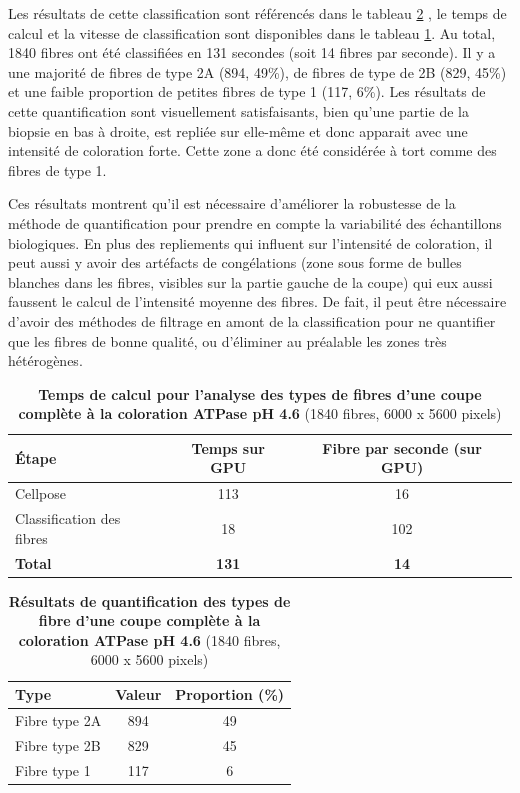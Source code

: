 Les résultats de cette classification sont référencés dans le tableau \ref{tab:atp_wsi_resultstable} , le temps de calcul et la vitesse de classification sont disponibles dans le tableau \ref{tab:atp_wsi_timetable}. Au total, 1840 fibres ont été classifiées en 131 secondes (soit 14 fibres par seconde). Il y a une majorité de fibres de type 2A (894, 49\%), de fibres de type de 2B (829, 45\%) et une faible proportion de petites fibres de type 1 (117, 6\%). Les résultats de cette quantification sont visuellement satisfaisants, bien qu'une partie de la biopsie en bas à droite, est repliée sur elle-même et donc apparait avec une intensité de coloration forte. Cette zone a donc été considérée à tort comme des fibres de type 1. 

Ces résultats montrent qu'il est nécessaire d'améliorer la robustesse de la méthode de quantification pour prendre en compte la variabilité des échantillons biologiques. En plus des repliements qui influent sur l'intensité de coloration, il peut aussi y avoir des artéfacts de congélations (zone sous forme de bulles blanches dans les fibres, visibles sur la partie gauche de la coupe) qui eux aussi faussent le calcul de l'intensité moyenne des fibres. De fait, il peut être nécessaire d'avoir des méthodes de filtrage en amont de la classification pour ne quantifier que les fibres de bonne qualité, ou d'éliminer au préalable les zones très hétérogènes.

\begin{table}[!ht]
\centering
\caption[Temps de calcul pour l'analyse des types de fibres d'une coupe complète ATPase]{\textbf{Temps de calcul pour l'analyse des types de fibres d'une coupe complète à la coloration ATPase pH 4.6} (1840 fibres, 6000 x 5600 pixels)}
\label{tab:atp_wsi_timetable}
\begin{tabular}{|l|c|c|}
\hline
\textbf{Étape} & \textbf{Temps sur GPU} & \textbf{Fibre par seconde (sur GPU)} \\
\hline
Cellpose & 113 & 16 \\
\hline
Classification des fibres & 18 & 102 \\
\hline
\textbf{Total} & \textbf{131} & \textbf{14} \\
\hline
\end{tabular}
\end{table}
\begin{table}[!ht]
\centering
\caption[Résultats de quantification des types de fibre d'une coupe complète ATPase]{\textbf{Résultats de quantification des types de fibre d'une coupe complète à la coloration ATPase pH 4.6} (1840 fibres, 6000 x 5600 pixels)}
\label{tab:atp_wsi_resultstable}
\begin{tabular}{|l|c|c|}
\hline
\textbf{Type} & \textbf{Valeur} & \textbf{Proportion (\%)} \\
\hline
Fibre type 2A & 894 & 49 \\
\hline
Fibre type 2B & 829 & 45 \\
\hline
Fibre type 1 & 117 & 6 \\
\hline
\end{tabular}
\end{table}


